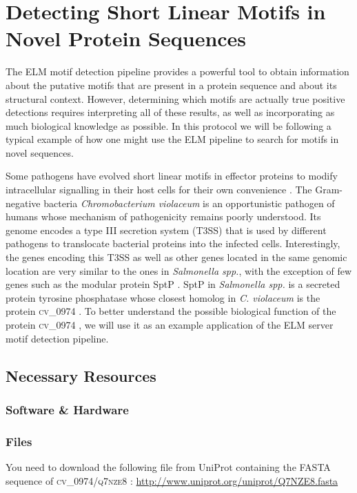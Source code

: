 \documentclass[12pt]{article}
\newcounter{proto}
\newcommand\uniprot[1]{%
	\textsc{\lowercase{#1}}%
}
\begin{document}

%
%
\section{Detecting Short Linear Motifs in Novel Protein Sequences}
\label{sec:predicting_cv_0974}

The ELM motif detection pipeline provides a powerful tool to obtain
information about the putative motifs that are present in a protein sequence and about its structural
context. However, determining which motifs are actually true positive detections
requires interpreting all of these results, as well as incorporating as much
biological knowledge as possible. In this protocol we will be following a typical
example of how one might use the ELM pipeline to search for motifs in novel
sequences.

Some pathogens have evolved short linear motifs in effector proteins to modify
intracellular signalling in their host cells for their own convenience
\citep{25475989}. The Gram-negative bacteria \textit{Chromobacterium violaceum} is an
opportunistic pathogen of humans whose mechanism of pathogenicity remains poorly
understood. Its genome encodes a type III secretion system (T3SS) that is used
by different pathogens to translocate bacterial proteins into the infected cells.
Interestingly, the genes encoding this T3SS as well as other genes located in
the same genomic location are very similar to the ones in \textit{Salmonella spp.}, with
the exception of few genes such as the modular protein SptP \citep{15100995}.
SptP in \textit{Salmonella spp.} is a secreted protein tyrosine phosphatase
\citep{8866485} whose closest homolog in \textit{C. violaceum} is the protein
\uniprot{CV\_0974}. To better understand the possible biological function of the
protein \uniprot{CV\_0974}, we will use it as an example application of the
ELM server motif detection pipeline.

%
%
\subsection*{Necessary Resources}
\subsubsection*{Software \& Hardware}

\subsubsection*{Files}
You need to download the following file from UniProt containing the FASTA
sequence of \uniprot{CV\_0974/Q7NZE8}:
\url{http://www.uniprot.org/uniprot/Q7NZE8.fasta}
\end{document}
